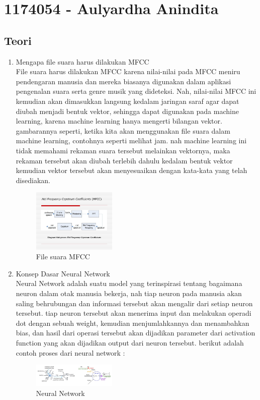 \section{1174054 - Aulyardha Anindita}

\subsection{Teori}
\begin{enumerate}
\item Mengapa file suara harus dilakukan MFCC\\
File suara harus dilakukan MFCC karena nilai-nilai pada MFCC meniru pendengaran manusia dan mereka biasanya digunakan dalam aplikasi pengenalan suara serta genre musik yang dideteksi. Nah, nilai-nilai MFCC ini kemudian akan dimasukkan langsung kedalam jaringan saraf agar dapat diubah menjadi bentuk vektor, sehingga dapat digunakan pada machine learning, karena machine learning hanya mengerti bilangan vektor. gambarannya seperti, ketika kita akan menggunakan file suara dalam machine learning, contohnya seperti melihat jam. nah machine learning ini tidak memahami rekaman suara tersebut melainkan vektornya, maka rekaman tersebut akan diubah terlebih dahulu kedalam bentuk vektor kemudian vektor tersebut akan menyesuaikan dengan kata-kata yang telah disediakan.
\hfill\break
	\begin{figure}[H]
		\includegraphics[width=4cm]{figures/1174054/6/1.jpg}
		\centering
		\caption{File suara MFCC}
	\end{figure}

\item Konsep Dasar Neural Network\\
Neural Network adalah suatu model yang terinspirasi tentang bagaimana neuron dalam otak manusia bekerja, nah tiap neuron pada manusia akan saling behrubungan dan informasi tersebut akan mengalir dari setiap neuron tersebut. tiap neuron tersebut akan menerima input dan melakukan operadi dot dengan sebuah weight, kemudian menjumlahkannya dan menambahkan bias, dan hasil dari operasi tersebut akan dijadikan parameter dari activation function yang akan dijadikan output dari neuron tersebut. berikut adalah contoh proses dari neural network :
\hfill\break
	\begin{figure}[H]
		\includegraphics[width=4cm]{figures/1174054/6/2.jpeg}
		\centering
		\caption{Neural Network}
	\end{figure}


\end{enumerate}
